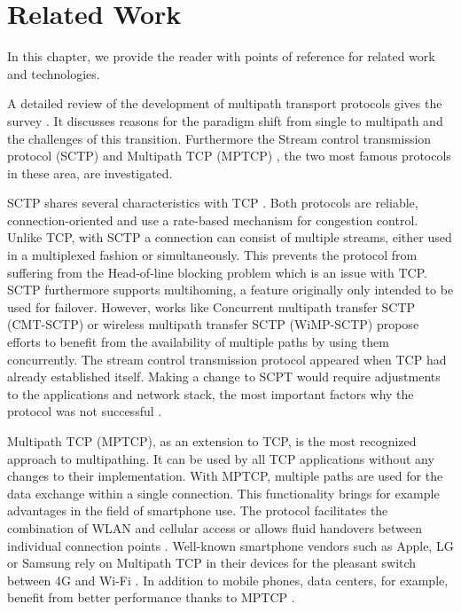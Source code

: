 \chapter{Related Work}
\label{chap:RelatedWork}

In this chapter, we provide the reader with points of reference for related work and technologies. %

A detailed review of the development of multipath transport protocols gives the survey \cite{MultiPathSurvey}. It discusses reasons for the paradigm shift from single to multipath and the challenges of this transition. Furthermore the Stream control transmission protocol (SCTP) \cite{SCTPWiki, rfc4960} and Multipath TCP (MPTCP) \cite{Barre2011, Raiciu2012, MPTCPWebMain,rfc6824}, the two most famous protocols in these area, are investigated.

SCTP shares several characteristics with TCP \cite{rfc793}. Both protocols are reliable, connection-oriented and use a rate-based mechanism for congestion control. Unlike TCP, with SCTP a connection can consist of multiple streams, either used in a multiplexed fashion or simultaneously. This prevents the protocol from suffering from the Head-of-line blocking problem \cite{HOLBlocking} which is an issue with TCP. SCTP furthermore supports multihoming, a feature originally only intended to be used for failover. However, works like Concurrent multipath transfer SCTP (CMT-SCTP) \cite{1709949} or wireless multipath transfer SCTP (WiMP-SCTP) \cite{8205908} propose efforts to benefit from the availability of multiple paths by using them concurrently. The stream control transmission protocol appeared when TCP had already established itself. Making a change to SCPT would require adjustments to the applications and network stack, the most important factors why the protocol was not successful \cite{WhyNotSCTP}.

Multipath TCP (MPTCP), as an extension to TCP, is the most recognized approach to multipathing. It can be used by all TCP applications without any changes to their implementation. With MPTCP, multiple paths are used for the data exchange within a single connection. This functionality brings for example advantages in the field of smartphone use. The protocol facilitates the combination of WLAN and cellular access \cite{MPTCPStudyWirelessAndCellular} or allows fluid handovers between individual connection points \cite{MPTCPStudyHandover}. Well-known smartphone vendors such as Apple, LG or Samsung rely on Multipath TCP in their devices for the pleasant switch between 4G and Wi-Fi \cite{MPTCPInSmartphones}. In addition to mobile phones, data centers, for example, benefit from better performance thanks to MPTCP \cite{RBPGWH11}.

